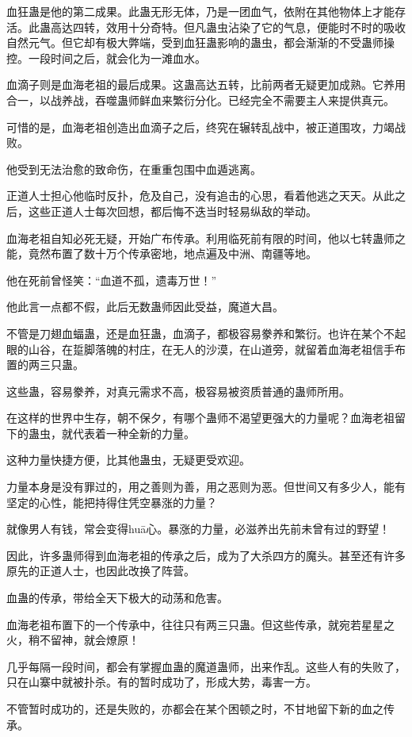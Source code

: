 \begin{this_body}
血狂蛊是他的第二成果。此蛊无形无体，乃是一团血气，依附在其他物体上才能存活。此蛊高达四转，效用十分奇特。但凡蛊虫沾染了它的气息，便能时不时的吸收自然元气。但它却有极大弊端，受到血狂蛊影响的蛊虫，都会渐渐的不受蛊师操控。一段时间之后，就会化为一滩血水。

血滴子则是血海老祖的最后成果。这蛊高达五转，比前两者无疑更加成熟。它养用合一，以战养战，吞噬蛊师鲜血来繁衍分化。已经完全不需要主人来提供真元。

可惜的是，血海老祖创造出血滴子之后，终究在辗转乱战中，被正道围攻，力竭战败。

他受到无法治愈的致命伤，在重重包围中血遁逃离。

正道人士担心他临时反扑，危及自己，没有追击的心思，看着他逃之天天。从此之后，这些正道人士每次回想，都后悔不迭当时轻易纵敌的举动。

血海老祖自知必死无疑，开始广布传承。利用临死前有限的时间，他以七转蛊师之能，竟然布置了数十万个传承密地，地点遍及中洲、南疆等地。

他在死前曾怪笑：“血道不孤，遗毒万世！”

他此言一点都不假，此后无数蛊师因此受益，魔道大昌。

不管是刀翅血蝠蛊，还是血狂蛊，血滴子，都极容易豢养和繁衍。也许在某个不起眼的山谷，在踅脚落魄的村庄，在无人的沙漠，在山道旁，就留着血海老祖信手布置的两三只蛊。

这些蛊，容易豢养，对真元需求不高，极容易被资质普通的蛊师所用。

在这样的世界中生存，朝不保夕，有哪个蛊师不渴望更强大的力量呢？血海老祖留下的蛊虫，就代表着一种全新的力量。

这种力量快捷方便，比其他蛊虫，无疑更受欢迎。

力量本身是没有罪过的，用之善则为善，用之恶则为恶。但世间又有多少人，能有坚定的心性，能把持得住凭空暴涨的力量？

就像男人有钱，常会变得huā心。暴涨的力量，必滋养出先前未曾有过的野望！

因此，许多蛊师得到血海老祖的传承之后，成为了大杀四方的魔头。甚至还有许多原先的正道人士，也因此改换了阵营。

血蛊的传承，带给全天下极大的动荡和危害。

血海老祖布置下的一个传承中，往往只有两三只蛊。但这些传承，就宛若星星之火，稍不留神，就会燎原！

几乎每隔一段时间，都会有掌握血蛊的魔道蛊师，出来作乱。这些人有的失败了，只在山寨中就被扑杀。有的暂时成功了，形成大势，毒害一方。

不管暂时成功的，还是失败的，亦都会在某个困顿之时，不甘地留下新的血之传承。


\end{this_body}
